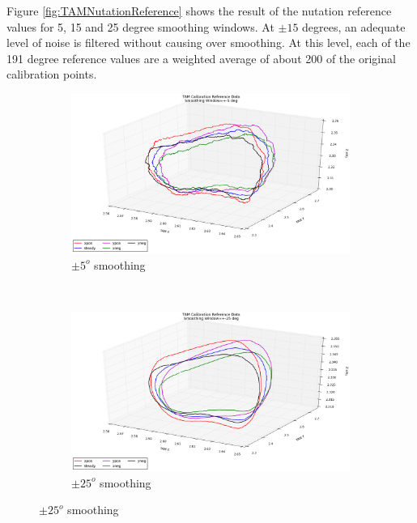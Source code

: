 Figure \ref{fig:TAMNutationReference} shows the result of the nutation reference values for 5, 15 and 25 degree smoothing windows.  At $\pm 15$ degrees, an adequate level of noise is filtered without causing over smoothing.  At this level, each of the 191 degree reference values are a weighted average of about 200 of the original calibration points.

\begin{figure}[H]
  \begin{subfigure}[h!]{0.5\textwidth}
    \includegraphics[width=\textwidth]{figures/tam_calibration_ref_5deg_smoothing.eps}
    \caption{$\pm 5^o$ smoothing}
    \label{fig:TAM5degCalibration}
  \end{subfigure}
  ~
  \begin{subfigure}[h!]{0.5\textwidth}
    \includegraphics[width=\textwidth]{figures/tam_calibration_ref_25deg_smoothing.eps}
    \caption{$\pm 25^o$ smoothing}
    \label{fig:TAM25degCalibration}
  \end{subfigure}


\end{figure}

